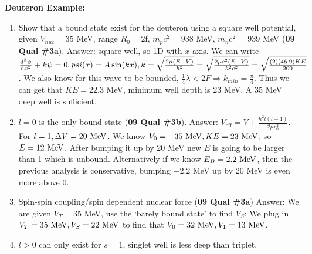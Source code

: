 \documentclass{school-22.101-notes}
\begin{document}
\textbf{Deuteron Example:} 
    \begin{enumerate}
    \item Show that a bound state exist for the deuteron using a square well potential, given $V_{nuc} = 35$ MeV, range $R_0 = 2$f, $m_p c^2 = 938$ MeV, $m_n c^2$ = 939 MeV (\textbf{09 Qual \#3a}). Answer: square well, so 1D with $x$ axis. We can write $ \frac{\mathrm{d}^{2}\psi}{\mathrm{d}x^{2}} + k \psi = 0, psi(x) = A \sin(kx),   k = \sqrt{ \frac{2\mu(E-V)}{\hbar^2}} =\sqrt{ \frac{2\mu c^2 (E-V)}{\hbar^2 c^2}} = \sqrt{\frac{(2)(46.9) KE}{200}}$. We also know for this wave to be bounded, $\displaystyle \frac{1}{4} \lambda < 2F \Rightarrow k_{min} = \frac{\pi}{4}$. Thus we can get that $KE = 22.3$ MeV, minimum well depth is 23 MeV. A 35 MeV deep well is sufficient. 

      
    \item $l=0$ is the only bound state (\textbf{09 Qual \#3b}). Answer: $V_{\mathrm{eff}} = V + \frac{\hbar^2 l(l+1)}{2 \mu r_0^2}$. 
    For $l=1, \Delta V = 20 \mbox{ } \mathrm{MeV}$. We know $V_0 = -35 \mbox{ } \mathrm{MeV}, KE = 23 \mbox{ } \mathrm{MeV}$, so $E = 12 \mbox{ } \mathrm{MeV}$. After bumping it up by 20 MeV new $E$ is going to be larger than 1 which is unbound. Alternatively if we know $E_B = 2.2 \mbox{ } \mathrm{MeV}$, then the previous analysis is conservative, bumping $-2.2$ MeV up by 20 MeV is even more above 0. 

    \item Spin-spin coupling/spin dependent nuclear force (\textbf{09 Qual \#3a}) Answer:
    We are given $V_T = 35$ MeV, use the `barely bound state' to find $V_S$: 
    We plug in $V_T = 35 \mbox{ } \mathrm{MeV}, V_S = 22 \mbox{ } \mathrm{MeV}$ to find that $V_0 = 32 \mbox{ } \mathrm{MeV}, V_1 = 13 \mbox{ } \mathrm{MeV}$. 

    \item $l>0$ can only exist for $s=1$, singlet well is less deep than triplet.     
    \end{enumerate}
\end{document}
